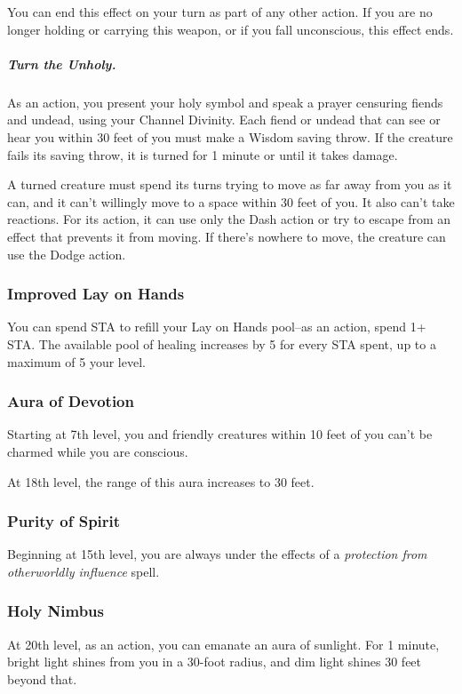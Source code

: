 You can end this effect on your turn as part of any other action. If you are no longer holding or carrying this weapon, or if you fall unconscious, this effect ends.

\subparagraph*{Turn the Unholy.} As an action, you present your holy symbol and speak a prayer censuring fiends and undead, using your Channel Divinity. Each fiend or undead that can see or hear you within 30 feet of you must make a Wisdom saving throw. If the creature fails its saving throw, it is turned for 1 minute or until it takes damage.

A turned creature must spend its turns trying to move as far away from you as it can, and it can't willingly move to a space within 30 feet of you. It also can't take reactions. For its action, it can use only the Dash action or try to escape from an effect that prevents it from moving. If there's nowhere to move, the creature can use the Dodge action.

\subsubsection{Improved Lay on Hands}
You can spend STA to refill your Lay on Hands pool--as an action, spend 1+ STA. The available pool of healing increases by 5 for every STA spent, up to a maximum of 5 \texttimes your level.

\subsubsection{Aura of Devotion}

Starting at 7th level, you and friendly creatures within 10 feet of you can't be charmed while you are conscious.

At 18th level, the range of this aura increases to 30 feet.

\subsubsection{Purity of Spirit}

Beginning at 15th level, you are always under the effects of a \textit{protection from otherworldly influence} spell.

\subsubsection{Holy Nimbus}

At 20th level, as an action, you can emanate an aura of sunlight. For 1 minute, bright light shines from you in a 30-foot radius, and dim light shines 30 feet beyond that.

